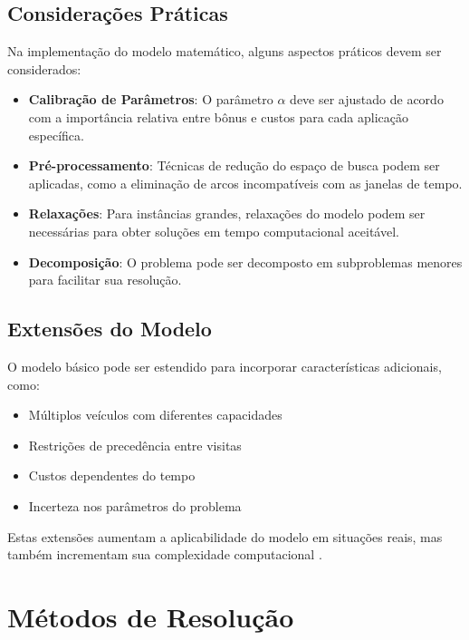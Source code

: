 \documentclass[12pt, a4paper]{report}
\begin{document}
\section{Considerações Práticas}
Na implementação do modelo matemático, alguns aspectos práticos devem ser considerados:

\begin{itemize}
    \item \textbf{Calibração de Parâmetros}: O parâmetro $\alpha$ deve ser ajustado de acordo com a importância relativa entre bônus e custos para cada aplicação específica.
    
    \item \textbf{Pré-processamento}: Técnicas de redução do espaço de busca podem ser aplicadas, como a eliminação de arcos incompatíveis com as janelas de tempo.
    
    \item \textbf{Relaxações}: Para instâncias grandes, relaxações do modelo podem ser necessárias para obter soluções em tempo computacional aceitável.
    
    \item \textbf{Decomposição}: O problema pode ser decomposto em subproblemas menores para facilitar sua resolução.
\end{itemize}

\section{Extensões do Modelo}
O modelo básico pode ser estendido para incorporar características adicionais, como:

\begin{itemize}
    \item Múltiplos veículos com diferentes capacidades
    \item Restrições de precedência entre visitas
    \item Custos dependentes do tempo
    \item Incerteza nos parâmetros do problema
\end{itemize}

Estas extensões aumentam a aplicabilidade do modelo em situações reais, mas também incrementam sua complexidade computacional \cite{gomes2016}.

\chapter{Métodos de Resolução}
\end{document}
